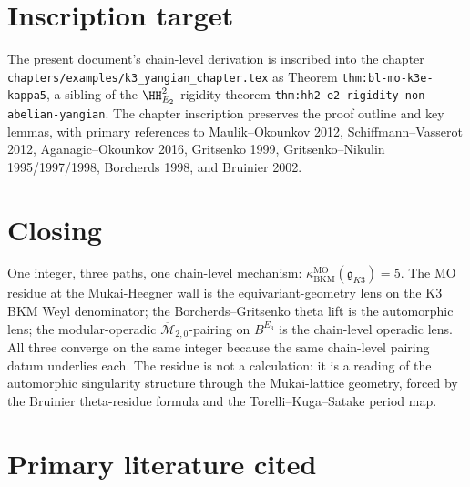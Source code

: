 \section*{Inscription target}

The present document's chain-level derivation is inscribed into
the chapter \texttt{chapters/examples/k3\_yangian\_chapter.tex} as
Theorem \texttt{thm:bl-mo-k3e-kappa5}, a sibling of the
$\HH^{2}_{E_{2}}$-rigidity theorem
\texttt{thm:hh2-e2-rigidity-non-abelian-yangian}.  The chapter
inscription preserves the proof outline and key lemmas, with
primary references to Maulik--Okounkov 2012, Schiffmann--Vasserot
2012, Aganagic--Okounkov 2016, Gritsenko 1999, Gritsenko--Nikulin
1995/1997/1998, Borcherds 1998, and Bruinier 2002.

\section*{Closing}

One integer, three paths, one chain-level mechanism:
$\kappa_{\mathrm{BKM}}^{\mathrm{MO}}(\mathfrak g_{K3}) = 5$.
The MO residue at the Mukai-Heegner wall is the equivariant-geometry
lens on the K3 BKM Weyl denominator; the Borcherds--Gritsenko theta
lift is the automorphic lens; the modular-operadic
$\overline{\mathcal M}_{2, 0}$-pairing on $B^{E_3}$ is the
chain-level operadic lens.  All three converge on the same integer
because the same chain-level pairing datum underlies each.  The
residue is not a calculation: it is a reading of the automorphic
singularity structure through the Mukai-lattice geometry, forced
by the Bruinier theta-residue formula and the Torelli--Kuga--Satake
period map.

\section*{Primary literature cited}

